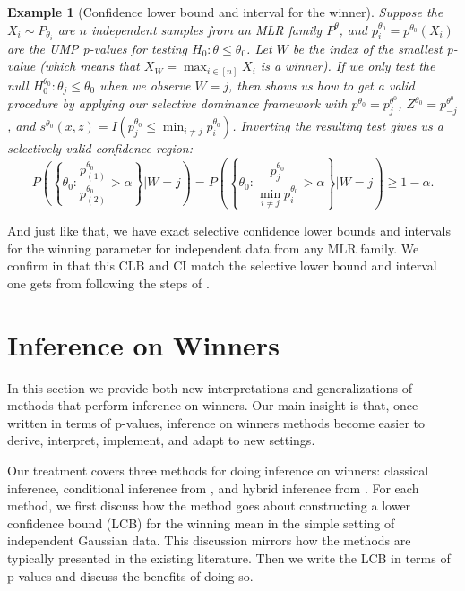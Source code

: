 \documentclass{article}
\newtheorem{example}{Example}
\begin{document}
\begin{example}[Confidence lower bound and interval for the winner] 
    \label{exm:confidence_interval}
    Suppose the $X_i \sim P_{\theta_i}$ are $n$ independent samples from an MLR family $P^{\theta}$, and $p^{\theta_0}_i =  p^{\theta_0}(X_i)$ are the UMP p-values for testing $H_0 : \theta \leq \theta_0$. Let $W$ be the index of the smallest p-value (which means that $X_W = \max_{i \in [n]} X_i$ is a winner). If we only test the null $H_0^{\theta_0}: \theta_j \leq \theta_0$ when we observe $W=j$, then  shows us how to get a valid procedure by applying our selective dominance framework with $p^{\theta_0} = p^{\theta^0}_j$, $Z^{\theta_0} = p^{\theta^0}_{-j}$, and $s^{\theta_0}(x, z) = I(p^{\theta_0}_j \leq \min_{i \neq j} p^{\theta_0}_i)$. Inverting the resulting test gives us a selectively valid confidence region:
    \begin{equation}
        \label{eq:winner_lcb}
        P\left(\left\{ \theta_0 : \frac{p^{\theta_0}_{(1)}}{p^{\theta_0}_{(2)}} > \alpha \right\} | W=j \right) = P\left(\left\{ \theta_0 : \frac{p^{\theta_0}_{j}}{ \min_{i \neq j} p^{\theta_0}_i} > \alpha \right\} | W=j \right) \geq 1-\alpha.
    \end{equation} 
\end{example}

And just like that, we have exact selective confidence lower bounds and intervals for the winning parameter for independent data from any MLR family. We confirm in  that this CLB and CI match the selective lower bound and interval one gets from following the steps of \cite{Fithian2017}. 


\section{Inference on Winners}
\label{sec:winner}

In this section we provide both new interpretations and generalizations of methods that perform inference on winners. Our main insight is that, once written in terms of p-values, inference on winners methods become easier to derive, interpret, implement, and adapt to new settings. 

Our treatment covers three methods for doing inference on winners: classical inference, conditional inference from \cite{Fithian2017}, and hybrid inference from \cite{Andrews2023}. For each method, we first discuss how the method goes about constructing a lower confidence bound (LCB) for the winning mean in the simple setting of independent Gaussian data. This discussion mirrors how the methods are typically presented in the existing literature. Then we write the LCB in terms of p-values and discuss the benefits of doing so. %
\end{document}
